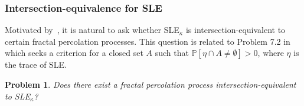 \documentclass[a4paper]{article}
\numberwithin{equation}{section}
\newtheorem{prob}[theorem]{\bf Problem}
\numberwithin{equation}{section}
\renewcommand{\1}{\mathbf{1}}
\begin{document}
\subsubsection*{Intersection-equivalence for SLE}

Motivated by~\cite{Peres-intersection}, it is natural to ask whether SLE$_\kappa$ is intersection-equivalent to certain fractal percolation processes. This question is related to Problem 7.2 in~\cite{Schramm-ICM} which seeks a criterion for a closed set $A$ such that $\mathbb{P}[\eta \cap A \neq \emptyset] >0$, where $\eta$ is the trace of SLE.

\begin{prob}
    Does there exist a fractal percolation process intersection-equivalent to SLE$_\kappa$?
\end{prob}



\end{document}
